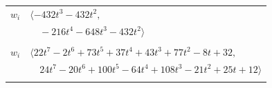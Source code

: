 \documentclass[11pt]{article}
\begin{document}
\begin{longtable}{@{}ll@{}}
$w_i$ & $\langle -432t^{3}-432t^{2},$\\
 & $\quad -216t^{4}-648t^{3}-432t^{2}\rangle$\\
\addlinespace[2pt]
\multicolumn{2}{@{}p{0.97\textwidth}@{}}{$i=63$, $D_i=2$, $\rho_{ij}$: $5{:}1, \allowbreak 8{:}2, \allowbreak 18{:}1, \allowbreak 19{:}1, \allowbreak 21{:}2, \allowbreak 25{:}1, \allowbreak 30{:}1, \allowbreak 31{:}2, \allowbreak 42{:}2, \allowbreak 47{:}1, \allowbreak 54{:}1, \allowbreak 58{:}2$}\\
$w_i$ & $\langle 22t^{7}-2t^{6}+73t^{5}+37t^{4}+43t^{3}+77t^{2}-8t+32,$\\
 & $\quad 24t^{7}-20t^{6}+100t^{5}-64t^{4}+108t^{3}-21t^{2}+25t+12\rangle$\\
\addlinespace[2pt]
\end{longtable}
\endgroup
\end{document}
